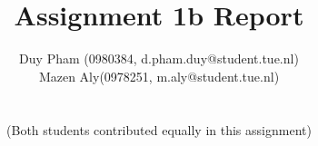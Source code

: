\documentclass[10pt, a4paper, titlepage]{article} %
\begin{document}
    \title{\rmfamily\normalfont{}\\
    Assignment 1b Report}
    \author{Duy Pham (0980384, d.pham.duy@student.tue.nl) \\ 
    Mazen Aly(0978251, m.aly@student.tue.nl) \\\\\\
    (Both students contributed equally in this assignment)}
    \date{} %
    
    \maketitle
    

    
    
    
    
\end{document}
